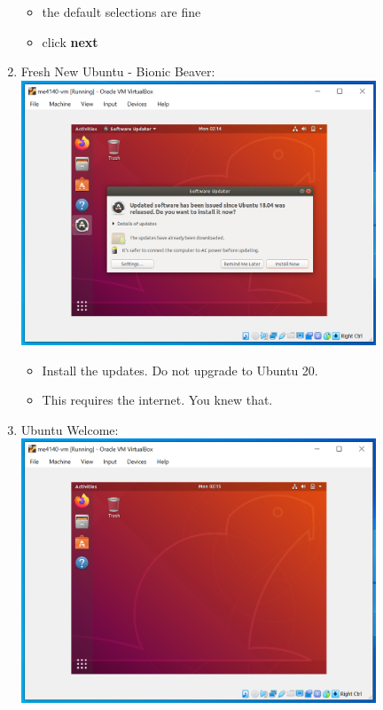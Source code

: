 \documentclass[12pt]{article}
\begin{document}
\begin{description}
\begin{description}
\begin{enumerate}[label=\alph*)]
      		 \begin{itemize}      	
     		\item the default selections are fine
     		\item click {\bf next}
    		\end{itemize}
    		
    		\newpage
    		\item Fresh New Ubuntu - Bionic Beaver: \vspace{5mm} \\
      		\includegraphics[scale=.55]{Capture25.png}
      		 \begin{itemize}
        	\item Install the updates. Do not upgrade to Ubuntu 20.
        	\item This requires the internet. You knew that. 
    		\end{itemize} 
    		 \vspace{5mm} 
    		\item Ubuntu Welcome: \vspace{5mm} \\
      		\includegraphics[scale=.55]{Capture26.png}

\end{enumerate}
\end{description}
\end{description}
\end{document}
